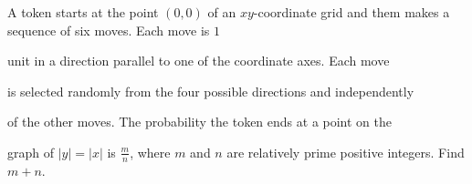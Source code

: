 A token starts at the point $(0,0)$ of an $xy$-coordinate grid and them makes a sequence of six moves. Each move is $1$

 unit in a direction parallel to one of the coordinate axes. Each move 

is selected randomly from the four possible directions and independently

 of the other moves. The probability the token ends at a point on the 

graph of $|y|=|x|$ is $\tfrac{m}{n}$,  where $m$ and $n$ are relatively prime positive integers. Find $m+n$.